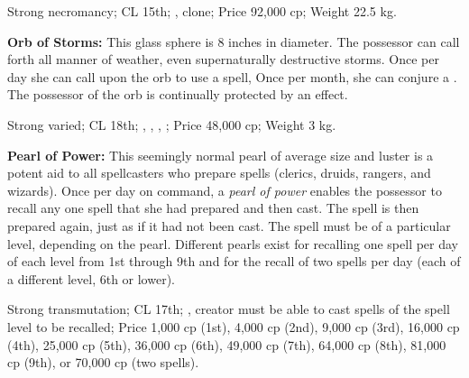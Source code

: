 Strong necromancy; CL 15th; , clone; Price 92,000 cp; Weight 22.5 kg.



\textbf{Orb of Storms:} This glass sphere is 8 inches in diameter. The possessor can call forth all manner of weather, even supernaturally destructive storms. Once per day she can call upon the orb to use a  spell, Once per month, she can conjure a . The possessor of the orb is continually protected by an  effect.

Strong varied; CL 18th; , , , ; Price 48,000 cp; Weight 3 kg.



\textbf{Pearl of Power:} This seemingly normal pearl of average size and luster is a potent aid to all spellcasters who prepare spells (clerics, druids, rangers, and wizards). Once per day on command, a \emph{pearl of power} enables the possessor to recall any one spell that she had prepared and then cast. The spell is then prepared again, just as if it had not been cast. The spell must be of a particular level, depending on the pearl. Different pearls exist for recalling one spell per day of each level from 1st through 9th and for the recall of two spells per day (each of a different level, 6th or lower).

Strong transmutation; CL 17th; , creator must be able to cast spells of the spell level to be recalled; Price 1,000 cp (1st), 4,000 cp (2nd), 9,000 cp (3rd), 16,000 cp (4th), 25,000 cp (5th), 36,000 cp (6th), 49,000 cp (7th), 64,000 cp (8th), 81,000 cp (9th), or 70,000 cp (two spells).








